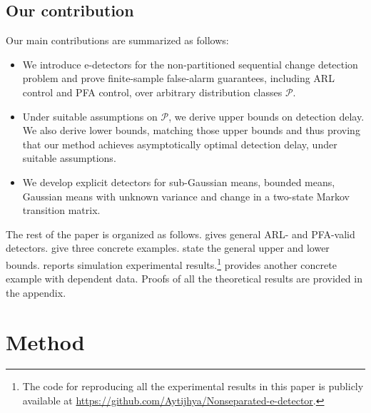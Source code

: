 \documentclass[12pt]{article}
\theoremstyle{spaced}
\theoremstyle{remark}
\newcommand{\calP}{\mathcal P}
\begin{document}
\subsection{Our contribution}
Our main contributions are summarized as follows: 
 \begin{itemize} 
 \item We introduce e-detectors for the  non-partitioned sequential change detection problem 
and prove finite-sample false-alarm guarantees, including ARL control and PFA control, over arbitrary distribution classes $\calP$. 
\item Under suitable assumptions on $\calP$, we derive upper bounds on detection delay. We also derive lower bounds, matching those upper bounds and thus proving that our method achieves asymptotically optimal detection delay, under suitable assumptions.
\item We develop explicit detectors for sub-Gaussian means, bounded means,
 Gaussian means with unknown variance and change in a two-state Markov transition matrix.  %
 \end{itemize}
The rest of the paper is organized as follows.
 gives general ARL- and PFA-valid detectors.
 give
three concrete examples.   state the general
upper and lower bounds.  reports
simulation experimental results.\footnote{The code for reproducing all the experimental results in this paper is publicly available at \href{https://github.com/Aytijhya/Nonseparated-e-detector}{https://github.com/Aytijhya/Nonseparated-e-detector}.}  provides another concrete example with dependent data. Proofs of all the theoretical results are provided in the appendix.

\section{Method}
\label{sec:method}
\end{document}

